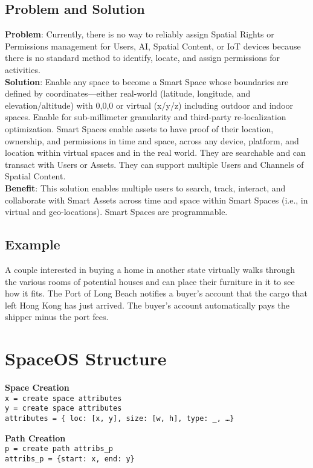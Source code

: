 \documentclass[10pt,a4paper]{article}
\begin{document}
\begin{multicols}{2}
    \subsection*{Problem and Solution}
    \textbf{Problem}: Currently, there is no way to reliably assign Spatial Rights or Permissions management for Users, AI, Spatial Content, or IoT devices because there is no standard method to identify, locate, and assign permissions for activities.\\
    \textbf{Solution}: Enable any space to become a Smart Space whose boundaries are defined by coordinates—either real-world (latitude, longitude, and elevation/altitude) with 0,0,0 or virtual (x/y/z) including outdoor and indoor spaces. Enable for sub-millimeter granularity and third-party re-localization optimization. Smart Spaces enable assets to have proof of their location, ownership, and permissions in time and space, across any device, platform, and location within virtual spaces and in the real world. They are searchable and can transact with Users or Assets. They can support multiple Users and Channels of Spatial Content.\\
    \textbf{Benefit}: This solution enables multiple users to search, track, interact, and collaborate with Smart Assets across time and space within Smart Spaces (i.e., in virtual and geo-locations). Smart Spaces are programmable.

    \subsection*{Example}
    A couple interested in buying a home in another state virtually walks through the various rooms of potential houses and can place their furniture in it to see how it fits. The Port of Long Beach notifies a buyer’s account that the cargo that left Hong Kong has just arrived. The buyer’s account automatically pays the shipper minus the port fees.

    \section*{SpaceOS Structure}
    \textbf{Space Creation}\\
    \texttt{x = create space attributes}\\
    \texttt{y = create space attributes}\\
    \texttt{attributes = \{ loc: [x, y], size: [w, h], type: \_, …\}}

    \textbf{Path Creation}\\
    \texttt{p = create path attribs\_p}\\
    \texttt{attribs\_p =  \{start: x, end: y\}}


\end{multicols}
\end{document}
